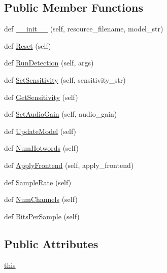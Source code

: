 \subsection*{Public Member Functions}
\begin{DoxyCompactItemize}
\item 
def \hyperlink{classsnowboydetect_1_1SnowboyDetect_aacebc037562e278d600502c85a6e6240}{\+\_\+\+\_\+init\+\_\+\+\_\+} (self, resource\+\_\+filename, model\+\_\+str)
\item 
def \hyperlink{classsnowboydetect_1_1SnowboyDetect_a721badd1050cbad9ecb3734610f5fec7}{Reset} (self)
\item 
def \hyperlink{classsnowboydetect_1_1SnowboyDetect_aa81c3446d9f86cdc82afe896b7503f92}{Run\+Detection} (self, args)
\item 
def \hyperlink{classsnowboydetect_1_1SnowboyDetect_a31672fe0859a72050c7e143c58c218c7}{Set\+Sensitivity} (self, sensitivity\+\_\+str)
\item 
def \hyperlink{classsnowboydetect_1_1SnowboyDetect_a836549077589837b8e94f563f3f9ff03}{Get\+Sensitivity} (self)
\item 
def \hyperlink{classsnowboydetect_1_1SnowboyDetect_acfa7c3d929aa0a1400a85f4c85883830}{Set\+Audio\+Gain} (self, audio\+\_\+gain)
\item 
def \hyperlink{classsnowboydetect_1_1SnowboyDetect_a5fe893dcbae408d4419b33b8f1c7db5a}{Update\+Model} (self)
\item 
def \hyperlink{classsnowboydetect_1_1SnowboyDetect_a281b6281e98d035872f289a4d31041dd}{Num\+Hotwords} (self)
\item 
def \hyperlink{classsnowboydetect_1_1SnowboyDetect_a4b4e6740fe532680390a8dcf3501a64a}{Apply\+Frontend} (self, apply\+\_\+frontend)
\item 
def \hyperlink{classsnowboydetect_1_1SnowboyDetect_aa4a6097517da1f8ba4fab8041e0748b8}{Sample\+Rate} (self)
\item 
def \hyperlink{classsnowboydetect_1_1SnowboyDetect_a46d9f2d6be050a727731557d7865ec96}{Num\+Channels} (self)
\item 
def \hyperlink{classsnowboydetect_1_1SnowboyDetect_a0281b47c8358e32c8aa464213b0dba97}{Bits\+Per\+Sample} (self)
\end{DoxyCompactItemize}
\subsection*{Public Attributes}
\begin{DoxyCompactItemize}
\item 
\hyperlink{classsnowboydetect_1_1SnowboyDetect_a1259775d218033e60489f0c00eac8eea}{this}
\end{DoxyCompactItemize}


